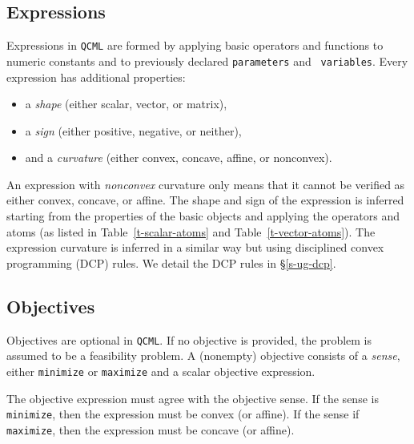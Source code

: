 \documentclass[11pt]{article}
\def\qcml{\texttt{QCML}\xspace}
\newcommand{\reals}{{\mbox{\bf R}}}
\begin{document}
\subsection{Expressions}
Expressions in \qcml are formed by applying basic operators and functions to
numeric constants and to previously declared {\tt parameters} and {\tt
variables}. Every expression has additional properties:
\begin{itemize}
\item a \emph{shape} (either scalar, vector, or matrix),
\item a \emph{sign} (either positive, negative, or neither),
\item and a \emph{curvature} (either convex, concave, affine, or nonconvex).
\end{itemize}
An expression with \emph{nonconvex} curvature only means that it cannot be
verified as either convex, concave, or affine. The shape and sign of the
expression is inferred starting from the properties of the basic objects and
applying the operators and atoms (as listed in
Table~\ref{t-scalar-atoms} and Table~\ref{t-vector-atoms}). The expression curvature is
inferred in a similar way but using disciplined convex programming (DCP)
rules. We detail the DCP rules in \S\ref{s-ug-dcp}.


%
%
%
%
%


\subsection{Objectives}
Objectives are optional in \qcml. If no objective is provided, the problem
is assumed to be a feasibility problem. A (nonempty) objective consists of a
\emph{sense}, either {\tt minimize} or {\tt maximize} and a scalar objective
expression.

The objective expression must agree with the objective sense.
If the sense is {\tt minimize}, then the expression must be convex (or affine).
If the sense if {\tt maximize}, then the expression must be concave (or affine).
\end{document}

